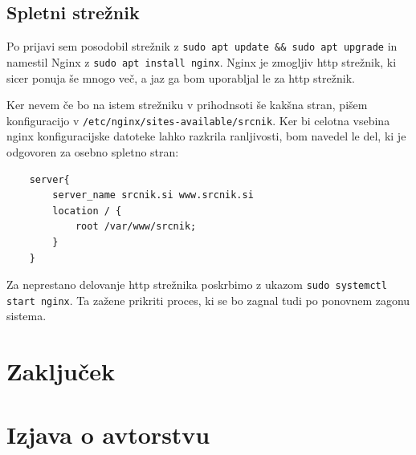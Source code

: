 \documentclass[12pt, a4paper]{article}
\begin{document}
\subsection{Spletni strežnik}
Po prijavi sem posodobil strežnik z \verb|sudo apt update && sudo apt upgrade| in namestil Nginx z \verb|sudo apt install nginx|.
Nginx je zmogljiv http strežnik, ki sicer ponuja še mnogo več, a jaz ga bom uporabljal le za http strežnik.\cite{nginx}

Ker nevem če bo na istem strežniku v prihodnsoti še kakšna stran, pišem konfiguracijo v \verb|/etc/nginx/sites-available/srcnik|.
Ker bi celotna vsebina nginx konfiguracijske datoteke lahko razkrila ranljivosti, bom navedel le del, ki je odgovoren za osebno spletno stran:
\begin{lstlisting}
	server{
		server_name srcnik.si www.srcnik.si
		location / {
			root /var/www/srcnik;
		}
	}
\end{lstlisting}
Za neprestano delovanje http strežnika poskrbimo z ukazom \verb|sudo systemctl start nginx|.
Ta zažene prikriti proces, ki se bo zagnal tudi po ponovnem zagonu sistema.

\section{Zaključek}


\section*{Izjava o avtorstvu}
\end{document}
